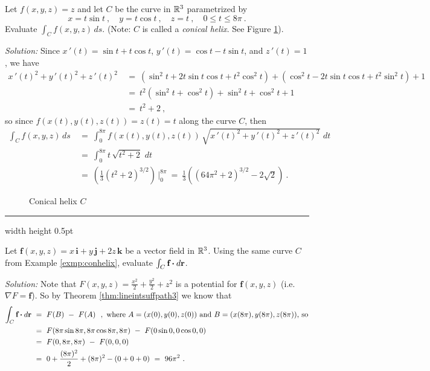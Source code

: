 \begin{exmp}\label{exmp:conhelix}
 Let $f(x,y,z) = z$ and let $C$ be the curve in $\mathbb{R}^{3}$ parametrized by
 \begin{displaymath}
  x=t\sin t ~,\quad y=t\cos t ~,\quad z=t ~,\quad 0\le t \le 8\pi ~.
 \end{displaymath}
 Evaluate $\int_C f(x,y,z)\,ds$. (Note:
 $C$ is called a \emph{conical helix}. See Figure \ref{fig:conhelix}).\vspace{1.5mm}
 \par\noindent \emph{Solution:} Since $x\,'(t)=\sin t + t\cos t$, $y\,'(t)=\cos t - t\sin t$, and $z\,'(t)=1$, we have
 \begin{align*}
  x\,'(t)^2 + y\,'(t)^2 + z\,'(t)^2 ~&=~ (\sin^2 t + 2t\sin t \cos t + t^2 \cos^2 t) + (\cos^2 t - 2t\sin t \cos t +
   t^2 \sin^2 t) + 1\\
   &=~ t^2 (\sin^2 t + \cos^2 t) + \sin^2 t + \cos^2 t + 1\\
   &=~ t^2 + 2 ~,
 \end{align*}
 so since $f(x(t),y(t),z(t)) = z(t) = t$ along the curve $C$, then
 \begin{align*}
  \int_C f(x,y,z)\,ds ~&=~ \int_0^{8\pi} f(x(t),y(t),z(t)) \,\sqrt{x\,'(t)^2 + y\,'(t)^2 + z\,'(t)^2}\,\,dt\\
   &=~ \int_0^{8\pi} t\,\sqrt{t^2 + 2}\,\,dt\\
   &=~ \left( \frac{1}{3} (t^2 + 2)^{3/2} \right) \,\Bigg|_0^{8\pi}
   ~=~ \frac{1}{3} \left( (64\pi^2 + 2)^{3/2} - 2\sqrt{2} \right) ~.
 \end{align*}\vspace{-24mm}
 \begin{figure}[h]
  \begin{center}
   
  \end{center}\vspace{-14mm}
  \caption[]{\quad Conical helix $C$}
  \label{fig:conhelix}
 \end{figure}
\end{exmp}\vspace{-2mm}
\hrule width \textwidth height 0.5pt
\begin{exmp}
 Let $\textbf{f}(x,y,z) = x\,\textbf{i} + y\,\textbf{j} + 2z\,\textbf{k}$ be a vector field in $\mathbb{R}^{3}$.
 Using the same curve $C$ from Example \ref{exmp:conhelix}, evaluate $\int_{C} \textbf{f} \bm{\cdot} d\textbf{r}$.\vspace{1.5mm}
 \par\noindent \emph{Solution:} Note that $F(x,y,z)=\frac{x^2}{2}+\frac{y^2}{2}+z^2$ is a potential for
 $\textbf{f}(x,y,z)$ (i.e. $\nabla F = \textbf{f}$). So by Theorem \ref{thm:lineintsuffpath3} we know that
 \begin{align*}
  \int_{C} \textbf{f} \bm{\cdot} d\textbf{r} ~&=~ F(B) ~-~ F(A) ~~,~\text{where $A=(x(0),y(0),z(0))$ and $B=(x(8\pi),y(8\pi),z(8\pi))$, so}\\
   &=~ F(8\pi\sin 8\pi,8\pi\cos 8\pi,8\pi) ~-~ F(0\sin 0,0\cos 0,0)\\
   &=~ F(0,8\pi,8\pi) ~-~ F(0,0,0)\\
   &=~ 0+\frac{(8\pi)^2}{2} + (8\pi)^2 - (0+0+0)
   ~=~ 96\pi^2 ~.
 \end{align*}
\end{exmp}
